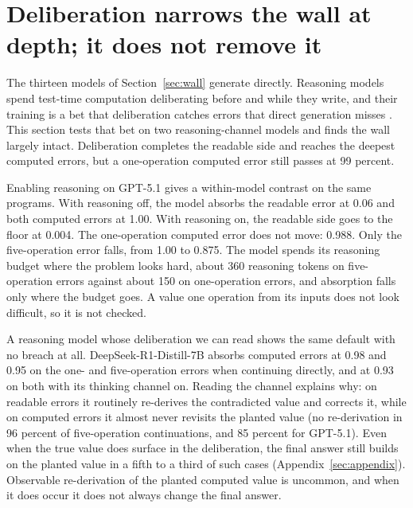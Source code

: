 \section{Deliberation narrows the wall at depth; it does not remove it}
\label{sec:reasoning}

The thirteen models of Section~\ref{sec:wall} generate directly. Reasoning models spend test-time computation deliberating before and while they write, and their training is a bet that deliberation catches errors that direct generation misses \citep{deepseekr1,snell2024testtime}. This section tests that bet on two reasoning-channel models and finds the wall largely intact. Deliberation completes the readable side and reaches the deepest computed errors, but a one-operation computed error still passes at 99 percent.

Enabling reasoning on GPT-5.1 gives a within-model contrast on the same programs. With reasoning off,
the model absorbs the readable error at 0.06 and both computed errors at 1.00. With reasoning on, the
readable side goes to the floor at 0.004. The one-operation computed error does not move: 0.988. Only
the five-operation error falls, from 1.00 to 0.875. The model spends its reasoning budget where the
problem looks hard, about 360 reasoning tokens on five-operation errors against about 150 on
one-operation errors, and absorption falls only where the budget goes. A value one operation from
its inputs does not look difficult, so it is not checked.

A reasoning model whose deliberation we can read shows the same default with no breach at all. DeepSeek-R1-Distill-7B \citep{deepseekr1} absorbs computed errors at 0.98 and 0.95 on the one- and five-operation errors when continuing directly, and at 0.93 on both with its thinking channel on. Reading the channel explains why: on readable errors it routinely re-derives the contradicted value and corrects it, while on computed errors it almost never revisits the planted value (no re-derivation in 96 percent of five-operation continuations, and 85 percent for GPT-5.1). Even when the true value does surface in the deliberation, the final answer still builds on the planted value in a fifth to a third of such cases (Appendix~\ref{sec:appendix}). Observable re-derivation of the planted computed value is uncommon, and when it does occur it does not always change the final answer.


